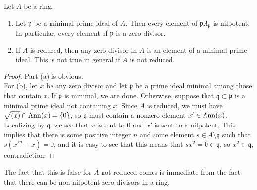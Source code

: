 \begin{exer}
	Let $A$ be a ring.
	\begin{enumerate}[label=(\alph*)]
		\item Let $\mathfrak p$ be a minimal prime ideal of $A$. Then
			every element of $\mathfrak pA_{\mathfrak p}$ is
			nilpotent. In particular, every element of $\mathfrak p$
			is a zero divisor.
		\item If $A$ is reduced, then any zero divisor in $A$ is an
			element of a minimal prime ideal. This is not true in
			general if $A$ is not reduced.
	\end{enumerate}
\end{exer}
\begin{proof}
	Part (a) is obvious.\\

	For (b), let $x$ be any zero divisor and let $\mathfrak p$ be a prime
	ideal minimal among those that contain $x$. If $\mathfrak p$ is minimal,
	we are done. Otherwise, suppose that $\mathfrak q \subset \mathfrak p$
	is a minimal prime ideal not containing $x$. Since $A$ is reduced, we
	must have $\sqrt{(x)} \cap \operatorname{Ann}(x) = \{ 0 \}$, so $\mathfrak q$ must
	contain a nonzero element $x' \in \operatorname{Ann}(x)$. Localizing by $\mathfrak q$,
	we see that $x$ is sent to $0$ and $x'$ is sent to a nilpotent. This
	implies that there is some positive integer $n$ and some element
	$s \in A \setminus \mathfrak q$ such that $s(x'^n-x) = 0$, and it is
	easy to see that this means that $sx^2 = 0 \in \mathfrak q$, so 
	$x^2 \in \mathfrak q$, contradiction.
\end{proof}
The fact that this is false for $A$ not reduced comes is immediate from the fact
that there can be non-nilpotent zero divisors in a ring.\\

